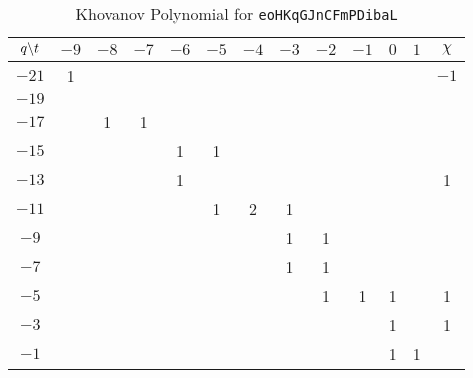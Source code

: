 \documentclass{article}
\theoremstyle{plain}
\begin{document}
        \begin{table}
            \centering
            \begin{tabular}{| c | c | c | c | c | c | c | c | c | c | c | c | c |}
                \hline
                $q\symbol{92}t$&$-9$&$-8$&$-7$&$-6$&$-5$&$-4$&$-3$&$-2$&$-1$&$0$&$1$&$\chi$\\
                \hline
                $-21$&1&&&&&&&&&&&$-1$\\
                \hline
                $-19$&&&&&&&&&&&&\\
                \hline
                $-17$&&1&1&&&&&&&&&\\
                \hline
                $-15$&&&&1&1&&&&&&&\\
                \hline
                $-13$&&&&1&&&&&&&&1\\
                \hline
                $-11$&&&&&1&2&1&&&&&\\
                \hline
                $-9$&&&&&&&1&1&&&&\\
                \hline
                $-7$&&&&&&&1&1&&&&\\
                \hline
                $-5$&&&&&&&&1&1&1&&1\\
                \hline
                $-3$&&&&&&&&&&1&&1\\
                \hline
                $-1$&&&&&&&&&&1&1&\\
                \hline
            \end{tabular}
            \caption{Khovanov Polynomial for \texttt{eoHKqGJnCFmPDibaL}}
        \end{table}
\end{document}
